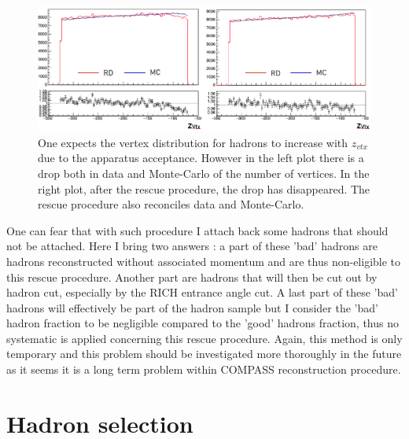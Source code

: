 \begin{figure}[!h]
	\includegraphics[scale=0.45]{./gfx/VertexDrop.png}
	\caption{One expects the vertex distribution for hadrons to increase with $z_{vtx}$ due to the apparatus acceptance. However in the left plot there is a drop both in data and Monte-Carlo of the number of vertices. In the right plot, after the rescue procedure, the drop has disappeared. The rescue procedure also reconciles data and Monte-Carlo.}
	\label{VertexDrop}
\end{figure}

One can fear that with such procedure I attach back some hadrons that should not be attached. Here I bring two answers : a part of these 'bad' hadrons are hadrons reconstructed without associated momentum and are thus non-eligible to this rescue procedure. Another part are hadrons that will then be cut out by hadron cut, especially by the RICH entrance angle cut. A last part of these 'bad' hadrons will effectively be part of the hadron sample but I consider the 'bad' hadron fraction to be negligible compared to the 'good' hadrons fraction, thus no systematic is applied concerning this rescue procedure. Again, this method is only temporary and this problem should be investigated more thoroughly in the future as it seems it is a long term problem within COMPASS reconstruction procedure.


\section{Hadron selection}

